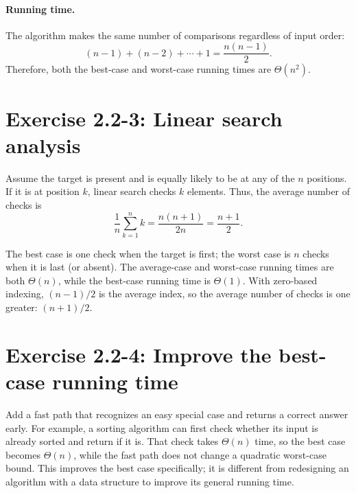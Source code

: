 \paragraph{Running time.}
The algorithm makes the same number of comparisons regardless of input order:
\begin{equation*}
    (n-1) + (n-2) + \cdots + 1 = \frac{n(n-1)}{2}.
\end{equation*}
Therefore, both the best-case and worst-case running times are
$\Theta(n^2)$.

\section{Exercise 2.2-3: Linear search analysis}

Assume the target is present and is equally likely to be at any of the $n$
positions. If it is at position $k$, linear search checks $k$ elements. Thus,
the average number of checks is
\begin{equation*}
    \frac{1}{n}\sum_{k=1}^{n} k
    = \frac{n(n+1)}{2n}
    = \frac{n+1}{2}.
\end{equation*}

The best case is one check when the target is first; the worst case is $n$
checks when it is last (or absent). The average-case and worst-case running
times are both $\Theta(n)$, while the best-case running time is $\Theta(1)$.
With zero-based indexing, $(n-1)/2$ is the average index, so the average number
of checks is one greater: $(n+1)/2$.

\section{Exercise 2.2-4: Improve the best-case running time}

Add a fast path that recognizes an easy special case and returns a correct
answer early. For example, a sorting algorithm can first check whether its
input is already sorted and return if it is. That check takes $\Theta(n)$ time,
so the best case becomes $\Theta(n)$, while the fast path does not change a
quadratic worst-case bound. This improves the best case specifically; it is
different from redesigning an algorithm with a data structure to improve its
general running time.
